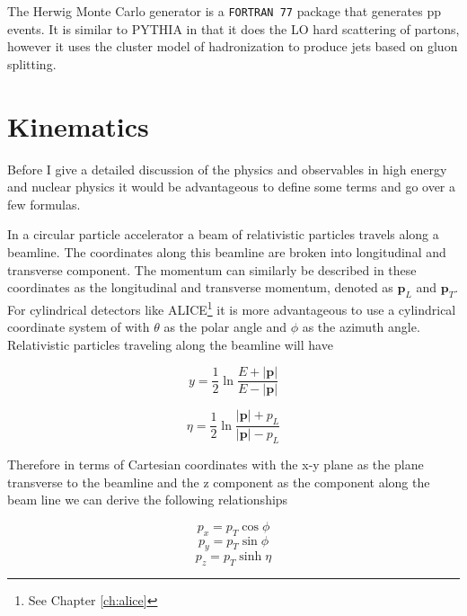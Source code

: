 The Herwig Monte Carlo generator is a \verb|FORTRAN 77| package that generates pp events.  It is similar to PYTHIA in that it does the LO hard scattering of partons, however it uses the cluster model of hadronization to produce jets based on gluon splitting.

\section{Kinematics}\label{sec:kinematics}


Before I give a detailed discussion of the physics and observables in high energy and nuclear physics it would be advantageous to define some terms and go over a few formulas.

In a circular particle accelerator a beam of relativistic particles travels along a beamline.  The coordinates along this beamline are broken into longitudinal and transverse component. The momentum can similarly be described in these coordinates as the longitudinal and transverse momentum, denoted as $\mathbf{p}_{L}$ and $\mathbf{p}_{T}$.  For cylindrical detectors like ALICE\footnote{See Chapter \ref{ch:alice}} it is more advantageous to use a cylindrical coordinate system of with $\theta$ as the polar angle and $\phi$ as the azimuth angle.  Relativistic particles traveling along the beamline will have 

\begin{equation}
\textit{y} = \frac{1}{2} \ln \frac{E + |\mathbf{p}|}{E - |\mathbf{p}|}
\label{eq:rapidity}
\end{equation}

\begin{equation}
\eta = \frac{1}{2} \ln \frac{|\mathbf{p}| + p_{L}}{|\mathbf{p}| - p_{L}}
\label{eq:psuedo}
\end{equation}

\noindent
Therefore in terms of Cartesian coordinates with the x-y plane as the plane transverse to the beamline and the z component as the component along the beam line we can derive the following relationships

\begin{equation}
p_{x} = p_{T} \cos \phi
\label{eq:xcomp}
\end{equation}
\begin{equation}
p_{y} = p_{T} \sin \phi
\label{eq:ycomp}
\end{equation}
\begin{equation}
p_{z} = p_{T} \sinh \eta
\label{eq:zcomp}
\end{equation}

